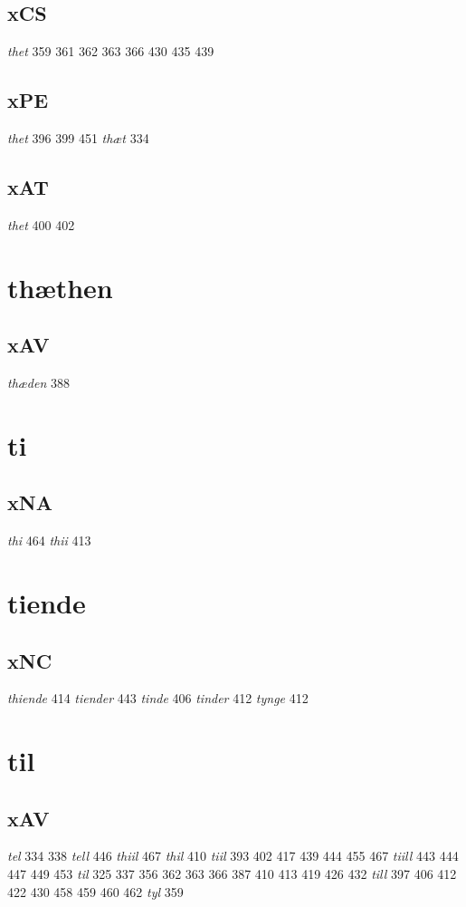 \documentclass[a4paper,twocolumn]{article}
\begin{document}
\subsection{xCS}
\label{sec:orga2508f2}
\emph{thet} 359 361 362 363 366 430 435 439 
\subsection{xPE}
\label{sec:orgd6b1a54}
\emph{thet} 396 399 451 \emph{thæt} 334 
\subsection{xAT}
\label{sec:org675db59}
\emph{thet} 400 402 
\section{thæthen}
\label{sec:orgca31087}
\subsection{xAV}
\label{sec:org3c3f590}
\emph{thæden} 388 
\section{ti}
\label{sec:org7676e12}
\subsection{xNA}
\label{sec:orgc3b8b6b}
\emph{thi} 464 \emph{thii} 413 
\section{tiende}
\label{sec:org8d081af}
\subsection{xNC}
\label{sec:org7b9afda}
\emph{thiende} 414 \emph{tiender} 443 \emph{tinde} 406 \emph{tinder} 412 \emph{tynge} 412 
\section{til}
\label{sec:orga80f840}
\subsection{xAV}
\label{sec:orgc32b08d}
\emph{tel} 334 338 \emph{tell} 446 \emph{thiil} 467 \emph{thil} 410 \emph{tiil} 393 402 417 439 444 455 467 \emph{tiill} 443 444 447 449 453 \emph{til} 325 337 356 362 363 366 387 410 413 419 426 432 \emph{till} 397 406 412 422 430 458 459 460 462 \emph{tyl} 359 
\end{document}
